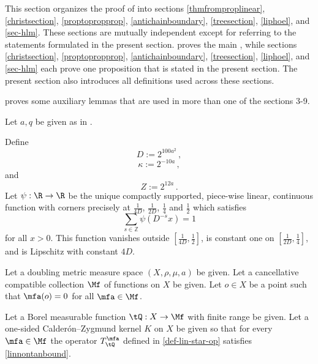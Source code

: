 This section organizes the proof of  into sections \ref{thmfromproplinear}, \ref{christsection}, \ref{proptopropprop}, \ref{antichainboundary}, \ref{treesection}, \ref{liphoel}, and \ref{sec-hlm}. These sections are mutually independent except for referring to the statements formulated in the present section.  proves the main , while sections \ref{christsection}, \ref{proptopropprop}, \ref{antichainboundary}, \ref{treesection}, \ref{liphoel}, and \ref{sec-hlm} each prove one proposition that is stated in the present section. The present section also introduces all definitions used across these sections.

 proves some auxiliary lemmas that are used in more than one of the sections 3-9.

Let $a, q$ be given as in .




Define
\begin{equation}\label{defineD}
    D:= 2^{100 a^2}\, ,
\end{equation}
\begin{equation}\label{definekappa}
    \kappa:= 2^{-10a}\,,
\end{equation}
and
\begin{equation}
    \label{defineZ}
    Z := 2^{12a}\,.
\end{equation}
Let
 $\psi:\R \to \R$ be the unique compactly supported, piece-wise linear, continuous function with corners precisely at $\frac 1{4D}$, $\frac 1{2D}$, $\frac 14$ and $\frac 12$ which satisfies
 \begin{equation}
    \label{eq-psisum}
    \sum_{s\in \mathbb{Z}} \psi(D^{-s}x)=1
\end{equation}
for all $x>0$. This function vanishes outside $[\frac1{4D},\frac 12]$, is constant one on
$[\frac1{2D},\frac 14]$, and is Lipschitz
with constant $4D$.




Let a doubling metric measure space $(X,\rho,\mu, a)$ be given.
Let a cancellative compatible collection $\Mf$ of functions on $X$ be given.
Let $o\in X$ be a point such that $\mfa(o)=0$
for all $\mfa\in \Mf$.


Let a Borel measurable function $\tQ:X\to \Mf$ with finite range be given.
Let a one-sided Calder\'on--Zygmund kernel $K$ on $X$ be given so that for every $\mfa\in \Mf$ the operator $T_{\tQ}^{\mfa}$ defined in \eqref{def-lin-star-op}
satisfies \eqref{linnontanbound}.



